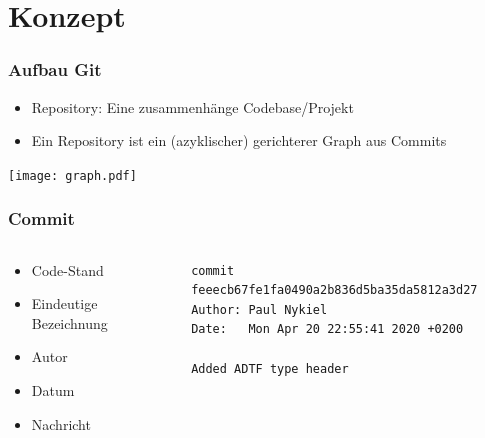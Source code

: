 \documentclass[aspectratio=169]{beamer}
\begin{document}
\section{Konzept}
\begin{frame}
    \frametitle{Aufbau Git}
    \begin{itemize}
        \item Repository: Eine zusammenhänge Codebase/Projekt
            \pause
        \item Ein Repository ist ein (azyklischer) gerichterer Graph aus Commits
            \pause
    \end{itemize}

    \texttt{[image: graph.pdf]}
\end{frame}

\begin{frame}[fragile]
    \frametitle{Commit}
    \begin{columns}
        \begin{column}{.25\textwidth}
            \begin{itemize}
                \item Code-Stand
                    \pause
                \item Eindeutige Bezeichnung
                    \pause
                \item Autor
                    \pause
                \item Datum
                    \pause
                \item Nachricht
            \end{itemize}
        \end{column}
        \begin{column}{.75\textwidth}
            \begin{verbatim}
commit feeecb67fe1fa0490a2b836d5ba35da5812a3d27
Author: Paul Nykiel
Date:   Mon Apr 20 22:55:41 2020 +0200

Added ADTF type header
            \end{verbatim}
        \end{column}
    \end{columns}
\end{frame}
\end{document}
